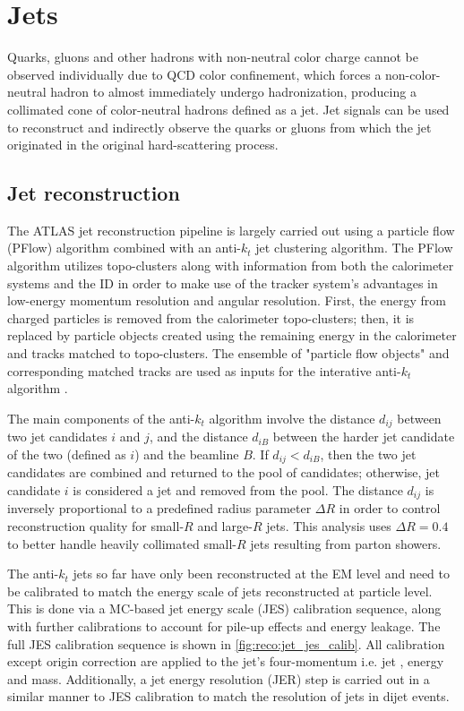 \documentclass[../thesis.tex]{subfiles}
\begin{document}
\section{Jets}
Quarks, gluons and other hadrons with non-neutral color charge cannot be observed individually due to \acs{QCD} color confinement, which forces a non-color-neutral hadron to almost immediately undergo hadronization, producing a collimated cone of color-neutral hadrons defined as a jet. Jet signals can be used to reconstruct and indirectly observe the quarks or gluons from which the jet originated in the original hard-scattering process.

\subsection{Jet reconstruction}

The ATLAS jet reconstruction pipeline is largely carried out using a particle flow (PFlow) algorithm combined with an anti-$k_t$ jet clustering algorithm. The PFlow algorithm \citep{reco:jet_pflow} utilizes topo-clusters along with information from both the calorimeter systems and the \acs{ID} in order to make use of the tracker system's advantages in low-energy momentum resolution and angular resolution. First, the energy from charged particles is removed from the calorimeter topo-clusters; then, it is replaced by particle objects created using the remaining energy in the calorimeter and tracks matched to topo-clusters. The ensemble of "particle flow objects" and corresponding matched tracks are used as inputs for the interative anti-$k_t$ algorithm \citep{reco:jet_antikt}.

The main components of the anti-$k_t$ algorithm involve the distance $d_{ij}$ between two jet candidates $i$ and $j$, and the distance $d_{iB}$ between the harder jet candidate of the two (defined as $i$) and the beamline $B$. If $d_{ij} < d_{iB}$, then the two jet candidates are combined and returned to the pool of candidates; otherwise, jet candidate $i$ is considered a jet and removed from the pool. The distance $d_{ij}$ is inversely proportional to a predefined radius parameter $\Delta R$ in order to control reconstruction quality for small-$R$ and large-$R$ jets. This analysis uses $\Delta R=0.4$ to better handle heavily collimated small-$R$ jets resulting from parton showers.

The anti-$k_t$ jets so far have only been reconstructed at the \acs{EM} level and need to be calibrated to match the energy scale of jets reconstructed at particle level. This is done via a \acs{MC}-based jet energy scale (\acs{JES}) calibration sequence, along with further calibrations to account for pile-up effects and energy leakage. The full \acs{JES} calibration sequence is shown in \autoref{fig:reco:jet_jes_calib}. All calibration except origin correction are applied to the jet's four-momentum i.e. jet \pT, energy and mass. Additionally, a jet energy resolution (\acs{JER}) \citep{reco:jet_jer} step is carried out in a similar manner to \acs{JES} calibration to match the resolution of jets in dijet events.\\
\end{document}
